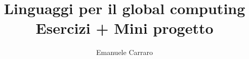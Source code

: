 \author{Emanuele Carraro}

\title{\textbf{Linguaggi per il global computing}\\
\large Esercizi + Mini progetto}
\date{}
\maketitle

\newpage
\tableofcontents

